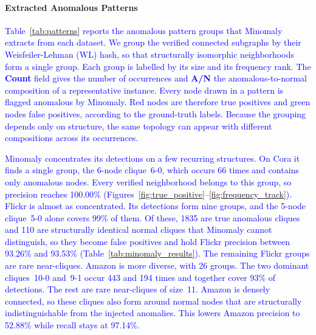 \documentclass[preprint,12pt]{elsarticle}
\newcommand{\new}[1]{\textcolor{blue}{#1}}
\theoremstyle{plain}
\theoremstyle{definition}
\theoremstyle{remark}
\begin{document}
\paragraph{Extracted Anomalous Patterns}
\new{Table~\ref{tab:patterns} reports the anomalous pattern groups that Minomaly extracts from each dataset. We group the verified connected subgraphs by their Weisfeiler-Lehman (WL) hash, so that structurally isomorphic neighborhoods form a single group. Each group is labelled by its size and its frequency rank. The \textbf{Count} field gives the number of occurrences and \textbf{A/N} the anomalous-to-normal composition of a representative instance. Every node drawn in a pattern is flagged anomalous by Minomaly. Red nodes are therefore true positives and green nodes false positives, according to the ground-truth labels. Because the grouping depends only on structure, the same topology can appear with different compositions across its occurrences.}

\new{Minomaly concentrates its detections on a few recurring structures. On Cora it finds a single group, the 6-node clique~6-0, which occurs 66 times and contains only anomalous nodes. Every verified neighborhood belongs to this group, so precision reaches 100.00\% (Figures~\ref{fig:true_positive}--\ref{fig:frequency_track}). Flickr is almost as concentrated. Its detections form nine groups, and the 5-node clique~5-0 alone covers 99\% of them. Of these, 1835 are true anomalous cliques and 110 are structurally identical normal cliques that Minomaly cannot distinguish, so they become false positives and hold Flickr precision between 93.26\% and 93.53\% (Table~\ref{tab:minomaly_results}). The remaining Flickr groups are rare near-cliques. Amazon is more diverse, with 26 groups. The two dominant cliques~10-0 and~9-1 occur 443 and 194 times and together cover 93\% of detections. The rest are rare near-cliques of size~11. Amazon is densely connected, so these cliques also form around normal nodes that are structurally indistinguishable from the injected anomalies. This lowers Amazon precision to 52.88\% while recall stays at 97.14\%.}
\end{document}
